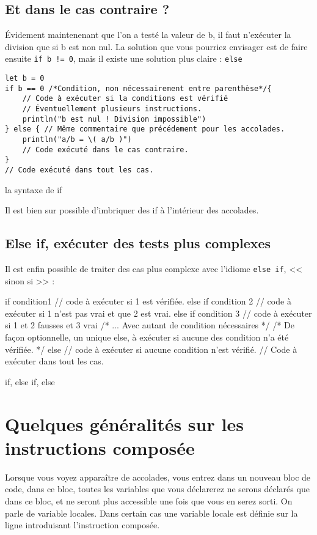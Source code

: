 \subsection{Et dans le cas contraire ?}
Évidement maintenenant que l'on  a testé la valeur de b, il faut n'exécuter la division que si b est non nul.
La solution que vous pourriez envisager est de faire ensuite
\texttt{if b != 0},
mais il existe une solution plus claire : \texttt{else}
\begin{listing}[h]
\begin{verbatim}
let b = 0
if b == 0 /*Condition, non nécessairement entre parenthèse*/{
    // Code à exécuter si la conditions est vérifié
    // Éventuellement plusieurs instructions.
    println("b est nul ! Division impossible")
} else { // Même commentaire que précédement pour les accolades.
    println("a/b = \( a/b )")
    // Code exécuté dans le cas contraire.
}
// Code exécuté dans tout les cas.
\end{verbatim}
\caption{la syntaxe de if}
\end{listing} %

Il est bien sur possible d'imbriquer des if à l'intérieur des accolades.
\subsection{Else if, exécuter des tests plus complexes}
Il est enfin possible de traiter des cas plus complexe avec l'idiome \texttt{else if}, << sinon si >> :
\begin{listing}[h]
if condition1 {
    // code à exécuter si 1 est vérifiée.
}
else if condition 2
{
    // code à exécuter si 1 n'est pas vrai et que 2 est vrai.
} else if condition 3 {
    // code à exécuter si 1 et 2 fausses et 3 vrai 
}
/* ... Avec autant de condition nécessaires */
/* De façon optionnelle, un unique else, à exécuter si aucune des condition n'a été vérifiée. */
else {
    // code à exécuter si aucune  condition n'est vérifié.
}
// Code à exécuter dans tout les cas.

\caption{if, else if, else}
\end{listing}
\section{Quelques généralités sur les instructions composée}
Lorsque vous voyez apparaître de accolades, vous entrez dans un nouveau bloc de code, dans ce bloc, toutes les variables que vous déclarerez ne serons déclarés que dans ce bloc, et ne seront plus accessible une fois que vous en serez sorti. On parle de variable locales. Dans certain cas une variable locale est définie sur la ligne introduisant l'instruction composée.

